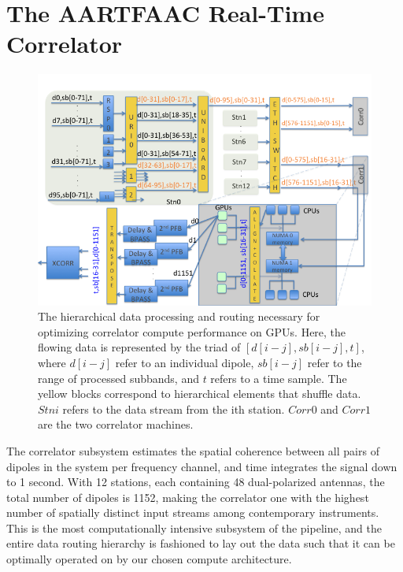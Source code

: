 \documentclass{ws-jai}
\begin{document}
\section {\label{sec:gpucorr} The AARTFAAC Real-Time Correlator}
\begin{figure}[htbp]
\centering
\includegraphics[width=1\textwidth]{Figs/data_routing_transform_hierarchy/Slide1.png}
\caption{The hierarchical  data processing and routing  necessary for optimizing
  correlator compute performance on GPUs.  Here, the flowing data is represented
  by the  triad of $[d[i-j],sb[i-j],t]$,  where $d[i-j]$ refer to  an individual
  dipole, $sb[i-j]$ refer to the range  of processed subbands, and $t$ refers to
  a time  sample.  The  yellow blocks correspond  to hierarchical  elements that
  shuffle data. $Stni$  refers to the data stream from  the ith station. $Corr0$
  and $Corr1$ are the two correlator machines.}
\label{fig:afaac_station_hw}
\end{figure}

The correlator  subsystem estimates the  spatial coherence between all  pairs of
dipoles in the system per frequency channel, and time integrates the signal down
to 1 second.  With 12 stations, each containing 48  dual-polarized antennas, the
total number  of dipoles  is 1152,  making the correlator  one with  the highest
number of spatially distinct input streams among contemporary instruments.  This
is the most computationally intensive subsystem  of the pipeline, and the entire
data routing  hierarchy is fashioned  to lay  out the data  such that it  can be
optimally operated on by our chosen compute architecture.
\end{document}
